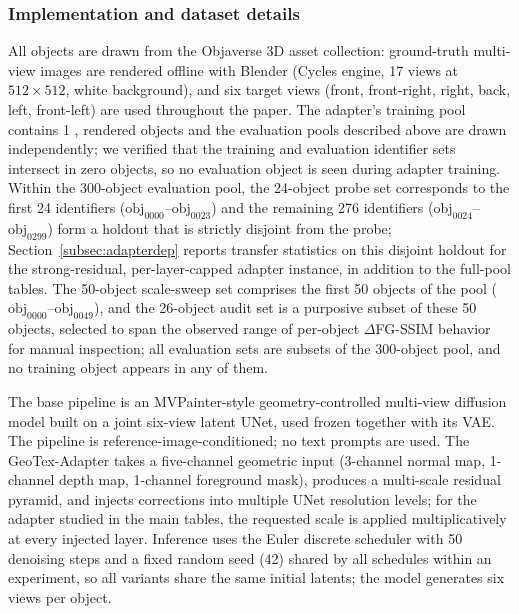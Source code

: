 \documentclass[times,twocolumn,final]{elsarticle}
\providecommand{\DIFadd}[1]{{\protect\color{blue} \sf #1}} %
\begin{document}
\subsubsection{\DIFadd{Implementation and dataset details}}

\DIFadd{All objects are drawn from the Objaverse 3D asset collection: ground-truth multi-view images are rendered offline with Blender (Cycles engine, 17 views at $512\times512$, white background), and six target views (front, front-right, right, back, left, front-left) are used throughout the paper. The adapter's training pool contains 1}{\DIFadd{,}}\DIFadd{118 rendered objects and the evaluation pools described above are drawn independently; we verified that the training and evaluation identifier sets intersect in zero objects, so no evaluation object is seen during adapter training. Within the 300-object evaluation pool, the 24-object probe set corresponds to the first 24 identifiers ($\mathrm{obj}_{0000}$--$\mathrm{obj}_{0023}$) and the remaining 276 identifiers ($\mathrm{obj}_{0024}$--$\mathrm{obj}_{0299}$) form a holdout that is strictly disjoint from the probe; Section~\ref{subsec:adapterdep} reports transfer statistics on this disjoint holdout for the strong-residual, per-layer-capped adapter instance, in addition to the full-pool tables. The 50-object scale-sweep set comprises the first 50 objects of the pool ($\mathrm{obj}_{0000}$--$\mathrm{obj}_{0049}$), and the 26-object audit set is a purposive subset of these 50 objects, selected to span the observed range of per-object $\Delta$FG-SSIM behavior for manual inspection; all evaluation sets are subsets of the 300-object pool, and no training object appears in any of them.
}

\DIFadd{The base pipeline is an MVPainter-style geometry-controlled multi-view diffusion model built on a joint six-view latent UNet, used frozen together with its VAE. The pipeline is reference-image-conditioned; no text prompts are used. The GeoTex-Adapter takes a five-channel geometric input (3-channel normal map, 1-channel depth map, 1-channel foreground mask), produces a multi-scale residual pyramid, and injects corrections into multiple UNet resolution levels; for the adapter studied in the main tables, the requested scale is applied multiplicatively at every injected layer. Inference uses the Euler discrete scheduler with 50 denoising steps and a fixed random seed (42) shared by all schedules within an experiment, so all variants share the same initial latents; the model generates six views per object.
}
\end{document}
